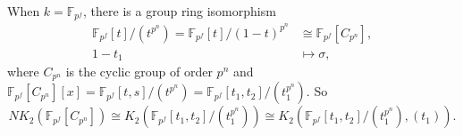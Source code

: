 When $k=\mathbb{F}_{p^f}$, there is a group ring isomorphism
\begin{align*}
\mathbb{F}_{p^f}[t]/(t^{p^n})=\mathbb{F}_{p^f}[t]/(1-t)^{p^n}&\cong \mathbb{F}_{p^f}[C_{p^n}],\\
1-t_1&\mapsto \sigma,
\end{align*}
where $C_{p^n}$ is the cyclic group of order $p^n$ and $\mathbb{F}_{p^f}[C_{p^n}][x]=\mathbb{F}_{p^f}[t,s]/(t^{p^n})=\mathbb{F}_{p^f}[t_1,t_2]/(t_1^{p^n})$. 
So
\[NK_2(\mathbb{F}_{p^f}[C_{p^n}])\cong K_2(\mathbb{F}_{p^f}[t_1,t_2]/(t_1^{p^n})) \cong K_2(\mathbb{F}_{p^f}[t_1,t_2]/(t_1^{p^n}),(t_1)).\]


